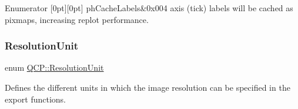 \begin{DoxyEnumFields}{Enumerator}
[0pt][0pt]{}\mbox{\label{namespace_q_c_p_a5400e5fcb9528d92002ddb938c1f4ef4a8e9cfe5ee0c5cd36dd7accf9739aff65}} 
ph\+Cache\+Labels&{\ttfamily 0x004} axis (tick) labels will be cached as pixmaps, increasing replot performance. \\
\hline

\end{DoxyEnumFields}
\mbox{\label{namespace_q_c_p_a715d46153da230990aa887d0f0602452}} 
\subsubsection{\texorpdfstring{Resolution\+Unit}{ResolutionUnit}}
{\footnotesize\ttfamily enum \mbox{\hyperlink{namespace_q_c_p_a715d46153da230990aa887d0f0602452}{Q\+C\+P\+::\+Resolution\+Unit}}}

Defines the different units in which the image resolution can be specified in the export functions.

